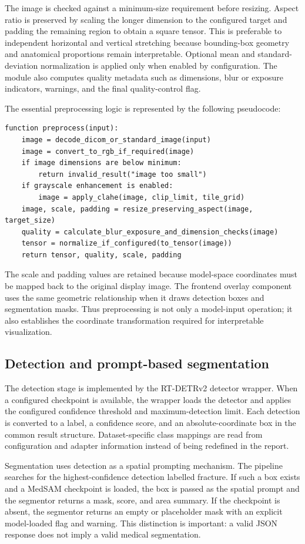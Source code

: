 \documentclass[12pt,a4paper]{article}
\begin{document}
The image is checked against a minimum-size requirement before resizing. Aspect ratio is preserved by scaling the longer dimension to the configured target and padding the remaining region to obtain a square tensor. This is preferable to independent horizontal and vertical stretching because bounding-box geometry and anatomical proportions remain interpretable. Optional mean and standard-deviation normalization is applied only when enabled by configuration. The module also computes quality metadata such as dimensions, blur or exposure indicators, warnings, and the final quality-control flag.

The essential preprocessing logic is represented by the following pseudocode:
\begin{lstlisting}
function preprocess(input):
    image = decode_dicom_or_standard_image(input)
    image = convert_to_rgb_if_required(image)
    if image dimensions are below minimum:
        return invalid_result("image too small")
    if grayscale enhancement is enabled:
        image = apply_clahe(image, clip_limit, tile_grid)
    image, scale, padding = resize_preserving_aspect(image, target_size)
    quality = calculate_blur_exposure_and_dimension_checks(image)
    tensor = normalize_if_configured(to_tensor(image))
    return tensor, quality, scale, padding
\end{lstlisting}

The scale and padding values are retained because model-space coordinates must be mapped back to the original display image. The frontend overlay component uses the same geometric relationship when it draws detection boxes and segmentation masks. Thus preprocessing is not only a model-input operation; it also establishes the coordinate transformation required for interpretable visualization.

\subsection{Detection and prompt-based segmentation}
The detection stage is implemented by the RT-DETRv2 detector wrapper. When a configured checkpoint is available, the wrapper loads the detector and applies the configured confidence threshold and maximum-detection limit. Each detection is converted to a label, a confidence score, and an absolute-coordinate box in the common result structure. Dataset-specific class mappings are read from configuration and adapter information instead of being redefined in the report.

Segmentation uses detection as a spatial prompting mechanism. The pipeline searches for the highest-confidence detection labelled fracture. If such a box exists and a MedSAM checkpoint is loaded, the box is passed as the spatial prompt and the segmentor returns a mask, score, and area summary. If the checkpoint is absent, the segmentor returns an empty or placeholder mask with an explicit model-loaded flag and warning. This distinction is important: a valid JSON response does not imply a valid medical segmentation.
\end{document}
